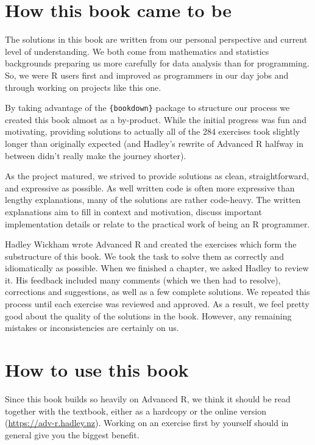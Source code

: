 \documentclass[
]{krantz}
\begin{document}
\hypertarget{how-this-book-came-to-be}{%
\section{How this book came to be}\label{how-this-book-came-to-be}}

The solutions in this book are written from our personal perspective and current level of understanding. We both come from mathematics and statistics backgrounds preparing us more carefully for data analysis than for programming. So, we were R users first and improved as programmers in our day jobs and through working on projects like this one.

By taking advantage of the \texttt{\{bookdown\}} package to structure our process we created this book almost as a by-product. While the initial progress was fun and motivating, providing solutions to actually all of the 284 exercises took slightly longer than originally expected (and Hadley's rewrite of Advanced R halfway in between didn't really make the journey shorter).

As the project matured, we strived to provide solutions as clean, straightforward, and expressive as possible. As well written code is often more expressive than lengthy explanations, many of the solutions are rather code-heavy. The written explanations aim to fill in context and motivation, discuss important implementation details or relate to the practical work of being an R programmer.

Hadley Wickham wrote Advanced R and created the exercises which form the substructure of this book. We took the task to solve them as correctly and idiomatically as possible. When we finished a chapter, we asked Hadley to review it. His feedback included many comments (which we then had to resolve), corrections and suggestions, as well as a few complete solutions. We repeated this process until each exercise was reviewed and approved. As a result, we feel pretty good about the quality of the solutions in the book. However, any remaining mistakes or inconsistencies are certainly on us.

\hypertarget{how-to-use-this-book}{%
\section{How to use this book}\label{how-to-use-this-book}}

Since this book builds so heavily on Advanced R, we think it should be read together with the textbook, either as a hardcopy or the online version (\url{https://adv-r.hadley.nz}). Working on an exercise first by yourself should in general give you the biggest benefit.
\end{document}
